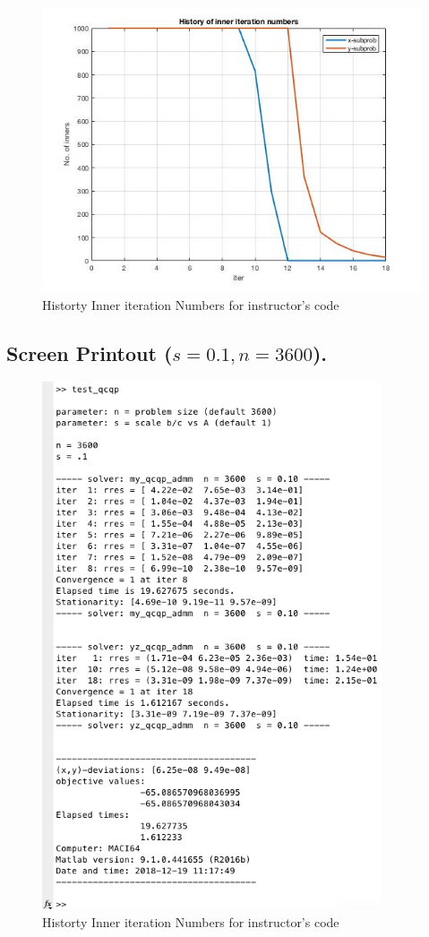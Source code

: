 \begin{figure}[H]
\centering
\includegraphics[width=12cm]{F_1/F_1_4.jpg}
\caption{Historty Inner iteration Numbers for instructor's code}
\end{figure}
\subsection{Screen Printout ($s=0.1,n=3600$).}
\begin{figure}[H]
\centering
\includegraphics[width=10cm]{F_1/F_1_1.png}
\caption{Historty Inner iteration Numbers for instructor's code}
\end{figure}


